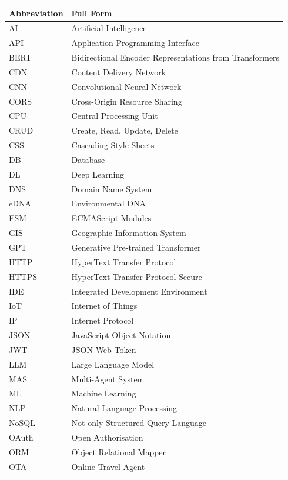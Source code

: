 \documentclass[12pt,a4paper]{report}
\begin{document}
\begin{longtable}{p{3.5cm}p{10cm}}
\toprule
\textbf{Abbreviation} & \textbf{Full Form} \\
\midrule
\endhead
AI      & Artificial Intelligence \\
API     & Application Programming Interface \\
BERT    & Bidirectional Encoder Representations from Transformers \\
CDN     & Content Delivery Network \\
CNN     & Convolutional Neural Network \\
CORS    & Cross-Origin Resource Sharing \\
CPU     & Central Processing Unit \\
CRUD   & Create, Read, Update, Delete \\
CSS     & Cascading Style Sheets \\
DB      & Database \\
DL      & Deep Learning \\
DNS     & Domain Name System \\
eDNA    & Environmental DNA \\
ESM     & ECMAScript Modules \\
GIS     & Geographic Information System \\
GPT     & Generative Pre-trained Transformer \\
HTTP    & HyperText Transfer Protocol \\
HTTPS   & HyperText Transfer Protocol Secure \\
IDE     & Integrated Development Environment \\
IoT     & Internet of Things \\
IP      & Internet Protocol \\
JSON    & JavaScript Object Notation \\
JWT     & JSON Web Token \\
LLM     & Large Language Model \\
MAS     & Multi-Agent System \\
ML      & Machine Learning \\
NLP     & Natural Language Processing \\
NoSQL   & Not only Structured Query Language \\
OAuth   & Open Authorisation \\
ORM     & Object Relational Mapper \\
OTA     & Online Travel Agent \\

\end{longtable}
\end{document}
